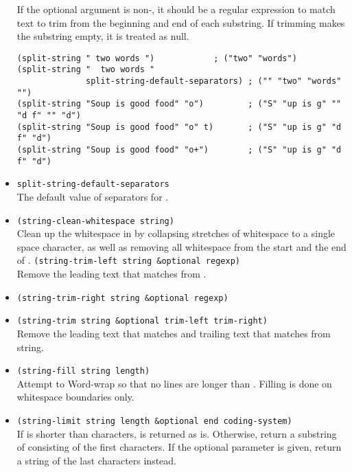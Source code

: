 \begin{itemize}[itemsep=10pt]
  If the optional argument  is non-, it should be a regular expression to match text to trim from the beginning and end of each substring.
  If trimming makes the substring empty, it is treated as null.
\begin{lstlisting}
(split-string " two words ")            ; ("two" "words")
(split-string "  two words "
              split-string-default-separators) ; ("" "two" "words" "")
(split-string "Soup is good food" "o")         ; ("S" "up is g" "" "d f" "" "d")
(split-string "Soup is good food" "o" t)       ; ("S" "up is g" "d f" "d")
(split-string "Soup is good food" "o+")        ; ("S" "up is g" "d f" "d")
\end{lstlisting}
\item \lstinline|split-string-default-separators|\\
  The default value of separators for .
\item \lstinline|(string-clean-whitespace string)|\\
  Clean up the whitespace in  by collapsing stretches of whitespace to a single space character, as well as removing all whitespace from the start and the end of .
  \lstinline|(string-trim-left string &optional regexp)|\\
  Remove the leading text that matches  from . 
\item \lstinline|(string-trim-right string &optional regexp)|
\item \lstinline|(string-trim string &optional trim-left trim-right)|\\
  Remove the leading text that matches  and trailing text that matches  from string. 
\item \lstinline|(string-fill string length)|\\
  Attempt to Word-wrap  so that no lines are longer than .
  Filling is done on whitespace boundaries only.
\item \lstinline|(string-limit string length &optional end coding-system)|\\
  If  is shorter than  characters,  is returned as is.
  Otherwise, return a substring of  consisting of the first  characters.
  If the optional  parameter is given, return a string of the  last characters instead.


\end{itemize}
